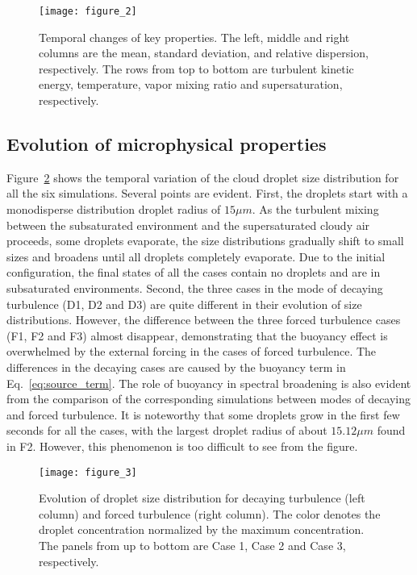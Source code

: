 \documentclass[draft,linenumbers]{agujournal}
\newcommand{\Eq}[1]{Eq.~\eqref{#1}}
\newcommand{\Fig}[1]{Figure~\ref{#1}}
\begin{document}
\begin{figure}[!htbp]\centering
\texttt{[image: figure\_2]}
\caption{Temporal changes of key properties. The left, middle and right columns are the mean, standard deviation, and relative dispersion, respectively. The rows from top to bottom are turbulent kinetic energy, temperature, vapor mixing ratio and supersaturation, respectively.\label{fig:therm_dynam}}
\end{figure}

\subsection{Evolution of microphysical properties}
\Fig{fig:rad_distri} shows the temporal variation of the cloud droplet size distribution for all the six simulations. Several points are evident. First, the droplets start with a monodisperse distribution droplet radius of $15\mu m$. As the turbulent mixing between the subsaturated environment and the supersaturated cloudy air proceeds, some droplets evaporate, the size distributions gradually shift to small sizes and broadens until all droplets completely evaporate. Due to the initial configuration, the final states of all the cases contain no droplets and are in subsaturated environments. Second, the three cases in {the mode of} decaying turbulence (D1, D2 and D3) are quite different in their evolution of size distributions. However, the difference between the three forced turbulence cases (F1, F2 and F3) almost disappear, demonstrating that the buoyancy effect is overwhelmed by the external forcing {in the cases of forced turbulence}. The differences in the decaying cases are caused by the buoyancy term in \Eq{eq:source_term}. The role of buoyancy in spectral broadening is also evident from the comparison of the corresponding simulations between modes of decaying and forced turbulence. {It is noteworthy that some droplets grow in the first few seconds for all the cases, with the largest droplet radius of about $15.12\mu m$ found in F2. However, this phenomenon is too difficult to see from the figure.}
\begin{figure}[!htbp]\centering
\texttt{[image: figure\_3]}
\caption{Evolution of droplet size distribution for decaying turbulence (left column) and forced turbulence (right column). The color denotes the droplet concentration normalized by the maximum concentration. The panels from up to bottom are Case 1, Case 2 and Case 3, respectively.} \label{fig:rad_distri}
\end{figure}
\end{document}

